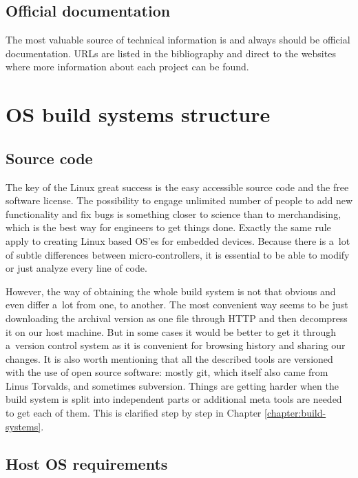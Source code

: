 \documentclass[printmode]{mgr}
\begin{document}
\subsection*{Official documentation}
The most valuable source of technical information is and always should be official documentation. URLs are listed in the bibliography and direct to the websites where more information about each project can be found.



\section{OS build systems structure}
\label{section:builders-structure}

\subsection{Source code}

The key of the Linux great success is the easy accessible source code and the free software license. The possibility to engage unlimited number of people to add new functionality and fix bugs is something closer to science than to merchandising, which is the best way for engineers to get things done. Exactly the same rule apply to creating Linux based OS'es for embedded devices. Because there is a~lot of subtle differences between micro-controllers, it is essential to be able to modify or just analyze every line of code.

However, the way of obtaining the whole build system is not that obvious and even differ a~lot from one, to another. The most convenient way seems to be just downloading the archival version as one file through HTTP and then decompress it on our host machine. But in some cases it would be better to get it through a~version control system as it is convenient for browsing history and sharing our changes. It is also worth mentioning that all the described tools are versioned with the use of open source software: mostly git, which itself also came from Linus Torvalds, and sometimes subversion. Things are getting harder when the build system is split into independent parts or additional meta tools are needed to get each of them. This is clarified step by step in Chapter \ref{chapter:build-systems}.


\subsection{Host OS requirements}
\end{document}
